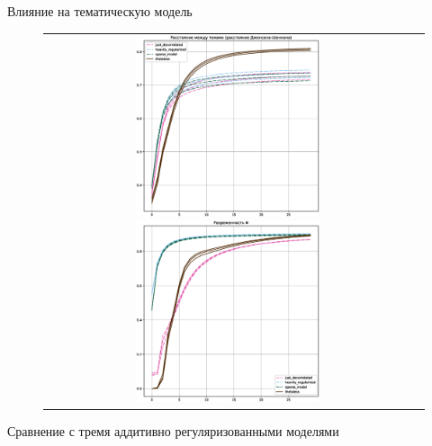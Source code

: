 \begin{frame}{Влияние на тематическую модель}

\begin{figure}
\setlength\tabcolsep{0pt} %
\begin{tabular}{cc}
\includegraphics[width=54mm]{images/CH4_vs_regularized_diversity_jensenshannon_False.eps}
\includegraphics[width=54mm]{images/CH4_vs_regularized_SparsityPhiScore.eps}& \end{tabular}
\end{figure}
Сравнение с тремя аддитивно регуляризованными моделями
\end{frame}


